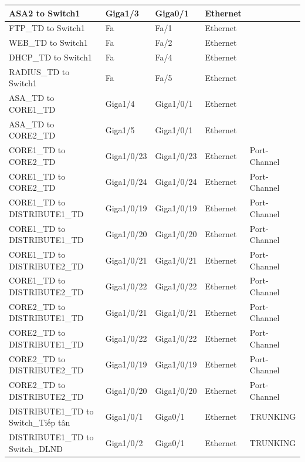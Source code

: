 \documentclass[a4paper, 12pt]{article}
\begin{document}
\begin{center}
\begin{longtable}{|p{}|p{}|p{}|p{}|p{}|}
\hline ASA2 to Switch1      &     Giga1/3     &     Giga0/1    &  Ethernet  &   \\
\hline FTP\_TD to Switch1      &     Fa     &     Fa/1    &  Ethernet  &   \\
\hline WEB\_TD to Switch1      &     Fa     &     Fa/2    &  Ethernet  &   \\
\hline DHCP\_TD to Switch1      &     Fa     &     Fa/4    &  Ethernet  &   \\
\hline RADIUS\_TD to Switch1      &     Fa     &     Fa/5    &  Ethernet  &   \\
\hline ASA\_TD to CORE1\_TD      &     Giga1/4     &     Giga1/0/1    &  Ethernet  &   \\
\hline ASA\_TD to CORE2\_TD      &     Giga1/5     &     Giga1/0/1    &  Ethernet  &   \\
\hline CORE1\_TD to CORE2\_TD      &     Giga1/0/23     &     Giga1/0/23    &  Ethernet  &  Port-Channel  \\
\hline CORE1\_TD to CORE2\_TD      &     Giga1/0/24     &     Giga1/0/24    &  Ethernet  &  Port-Channel  \\
\hline CORE1\_TD to DISTRIBUTE1\_TD      &     Giga1/0/19     &     Giga1/0/19    &  Ethernet  &  Port-Channel  \\
\hline CORE1\_TD to DISTRIBUTE1\_TD      &     Giga1/0/20     &     Giga1/0/20    &  Ethernet  &  Port-Channel  \\
\hline CORE1\_TD to DISTRIBUTE2\_TD      &     Giga1/0/21     &     Giga1/0/21    &  Ethernet  &  Port-Channel  \\
\hline CORE1\_TD to DISTRIBUTE2\_TD      &     Giga1/0/22     &     Giga1/0/22    &  Ethernet  &  Port-Channel  \\
\hline CORE2\_TD to DISTRIBUTE1\_TD      &     Giga1/0/21     &     Giga1/0/21    &  Ethernet  &  Port-Channel  \\
\hline CORE2\_TD to DISTRIBUTE1\_TD      &     Giga1/0/22     &     Giga1/0/22    &  Ethernet  &  Port-Channel  \\
\hline CORE2\_TD to DISTRIBUTE2\_TD      &     Giga1/0/19     &     Giga1/0/19    &  Ethernet  &  Port-Channel  \\
\hline CORE2\_TD to DISTRIBUTE2\_TD      &     Giga1/0/20     &     Giga1/0/20    &  Ethernet  &  Port-Channel  \\
\hline DISTRIBUTE1\_TD to Switch\_Tiếp tân      &     Giga1/0/1     &     Giga0/1    &  Ethernet  &  TRUNKING  \\
\hline DISTRIBUTE1\_TD to Switch\_DLND      &     Giga1/0/2     &     Giga0/1    &  Ethernet  &  TRUNKING  \\

\end{longtable}
\end{center}
\end{document}
